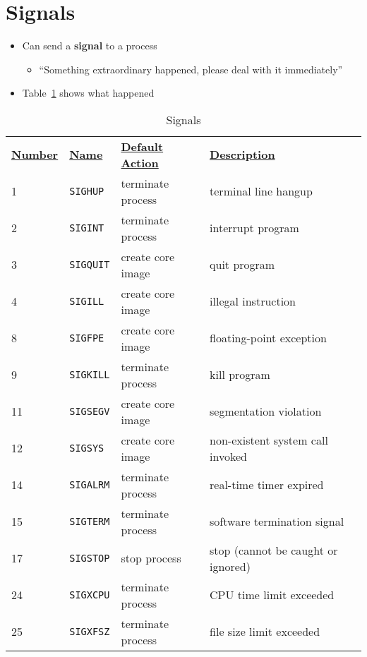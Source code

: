 \documentclass[krantzl]{krantz}
\newcommand{\tblref}[1]{Table~\ref{#1}}
\newcommand{\glossref}[1]{\textbf{#1}}
\begin{document}
\section{Signals}
\begin{itemize}
\item Can send a \glossref{signal} to a process\begin{itemize}
\item “Something extraordinary happened, please deal with it immediately”

\end{itemize}


\item \tblref{process_signals} shows what happened

\end{itemize}
\begin{table}
\centering
\begin{tabular}{llll}
\textbf{\underline{Number}} & \textbf{\underline{Name}} & \textbf{\underline{Default Action}} & \textbf{\underline{Description}} \\
1 & \texttt{SIGHUP} & terminate process & terminal line hangup \\
2 & \texttt{SIGINT} & terminate process & interrupt program \\
3 & \texttt{SIGQUIT} & create core image & quit program \\
4 & \texttt{SIGILL} & create core image & illegal instruction \\
8 & \texttt{SIGFPE} & create core image & floating-point exception \\
9 & \texttt{SIGKILL} & terminate process & kill program \\
11 & \texttt{SIGSEGV} & create core image & segmentation violation \\
12 & \texttt{SIGSYS} & create core image & non-existent system call invoked \\
14 & \texttt{SIGALRM} & terminate process & real-time timer expired \\
15 & \texttt{SIGTERM} & terminate process & software termination signal \\
17 & \texttt{SIGSTOP} & stop process & stop (cannot be caught or ignored) \\
24 & \texttt{SIGXCPU} & terminate process & CPU time limit exceeded \\
25 & \texttt{SIGXFSZ} & terminate process & file size limit exceeded \\
\end{tabular}
\caption{Signals}
\label{process_signals}
\end{table}
\end{document}
